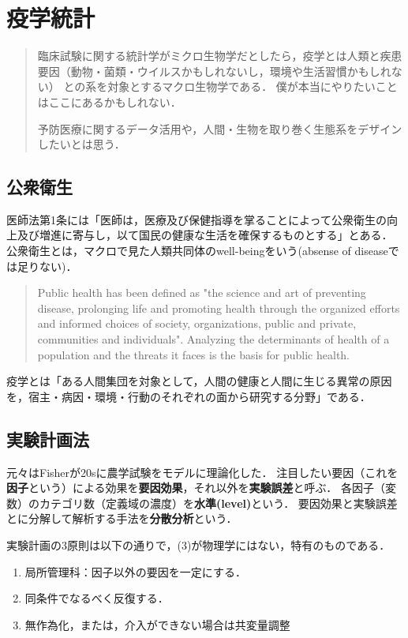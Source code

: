 \documentclass[uplatex,dvipdfmx]{jsreport}
\begin{document}
\chapter{疫学統計}

\begin{quotation}
    臨床試験に関する統計学がミクロ生物学だとしたら，疫学とは人類と疾患要因（動物・菌類・ウイルスかもしれないし，環境や生活習慣かもしれない）
    との系を対象とするマクロ生物学である．
    僕が本当にやりたいことはここにあるかもしれない．

    予防医療に関するデータ活用や，人間・生物を取り巻く生態系をデザインしたいとは思う．
\end{quotation}

\section{公衆衛生}

医師法第1条には「医師は，医療及び保健指導を掌ることによって公衆衛生の向上及び増進に寄与し，以て国民の健康な生活を確保するものとする」とある．
公衆衛生とは，マクロで見た人類共同体のwell-beingをいう(absense of diseaseでは足りない)．
\begin{quote}
    Public health has been defined as "the science and art of preventing disease, prolonging life and promoting health through the organized efforts and informed choices of society, organizations, public and private, communities and individuals".
    Analyzing the determinants of health of a population and the threats it faces is the basis for public health.
\end{quote}
疫学とは「ある人間集団を対象として，人間の健康と人間に生じる異常の原因を，宿主・病因・環境・行動のそれぞれの面から研究する分野」である．

\section{実験計画法}

\begin{history}
    元々はFisherが20sに農学試験をモデルに理論化した．
    注目したい要因（これを\textbf{因子}という）による効果を\textbf{要因効果}，それ以外を\textbf{実験誤差}と呼ぶ．
    各因子（変数）のカテゴリ数（定義域の濃度）を\textbf{水準(level)}という．
    要因効果と実験誤差とに分解して解析する手法を\textbf{分散分析}という．
\end{history}

\begin{axiom}
    実験計画の3原則は以下の通りで，(3)が物理学にはない，特有のものである．
    \begin{enumerate}
        \item 局所管理科：因子以外の要因を一定にする．
        \item 同条件でなるべく反復する．
        \item 無作為化，または，介入ができない場合は共変量調整
    \end{enumerate}
\end{axiom}
\end{document}
